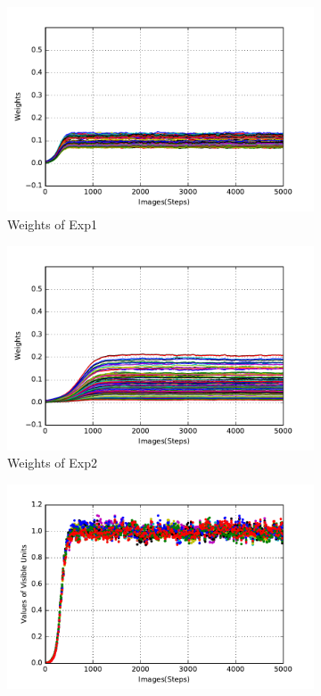 \begin{figure}
	\centering
	\begin{subfigure}[t]{0.4\textwidth}
		\includegraphics[width=\textwidth]{pics_sdlm/21_exp_AE_noise/exp1_weights_s.pdf}
		\caption{Weights of Exp1}
	\end{subfigure}
	\begin{subfigure}[t]{0.4\textwidth}
		\includegraphics[width=\textwidth]{pics_sdlm/21_exp_AE_noise/exp2_weights_s.pdf}
		\caption{Weights of Exp2}
	\end{subfigure}
	\begin{subfigure}[t]{0.4\textwidth}
		\includegraphics[width=\textwidth]{pics_sdlm/21_exp_AE_noise/exp1_recon_s.pdf}

\end{subfigure}
\end{figure}
